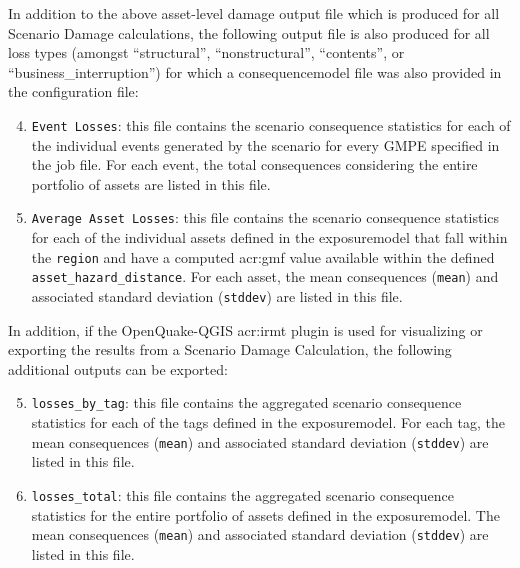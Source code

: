 In addition to the above asset-level damage output file which is
produced for all Scenario Damage calculations, the following output file is
also produced for all loss types
(amongst ``structural'', ``nonstructural'', ``contents'', or
``business\_interruption'') for which a \gls{consequencemodel} file was also
provided in the configuration file:

\begin{enumerate}
\setcounter{enumi}{3}

  \item \Verb+Event Losses+: this file contains the scenario consequence
    statistics for each of the individual events generated by the 
    scenario for every GMPE specified in the job file. For each event, 
    the total consequences considering the entire portfolio of \glspl{asset}
    are listed in this file.

  \item \Verb+Average Asset Losses+: this file contains the scenario consequence
    statistics for each of the individual \glspl{asset} defined in the
    \gls{exposuremodel} that fall within the \Verb+region+ and have
    a computed \gls{acr:gmf} value available within the defined
    \Verb+asset_hazard_distance+. For each \gls{asset}, the mean consequences
    (\Verb+mean+) and associated standard deviation (\Verb+stddev+) are listed
    in this file.

\end{enumerate}

In addition, if the OpenQuake-QGIS \gls{acr:irmt} plugin is used for
visualizing or exporting the results from a Scenario Damage Calculation, the
following additional outputs can be exported:

\begin{enumerate}
\setcounter{enumi}{4}

  \item \Verb+losses_by_tag+: this file contains the aggregated scenario
    consequence statistics for each of the \glspl{tag} defined in the
    \gls{exposuremodel}. For each \gls{tag}, the mean consequences
    (\Verb+mean+) and associated standard deviation (\Verb+stddev+) are listed
    in this file.

  \item \Verb+losses_total+: this file contains the aggregated scenario
    consequence statistics for the entire portfolio of \glspl{asset} defined
    in the \gls{exposuremodel}. The mean consequences (\Verb+mean+) and 
    associated standard deviation (\Verb+stddev+) are listed in this file.

\end{enumerate}

